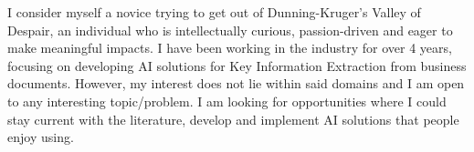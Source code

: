 I consider myself a novice trying to get out of Dunning-Kruger's Valley of Despair, an individual who is intellectually curious, passion-driven and eager to make meaningful impacts. I have been working in the industry for over 4 years, focusing on developing AI solutions for Key Information Extraction from business documents. However, my interest does not lie within said domains and I am open to any interesting topic/problem. I am looking for opportunities where I could stay current with the literature, develop and implement AI solutions that people enjoy using.